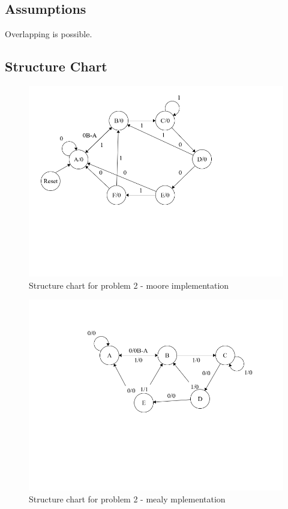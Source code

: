 \documentclass[11pt]{report}
\begin{document}
\subsection{Assumptions}
Overlapping is possible.
\pagebreak
\subsection{Structure Chart}
	\begin{figure}[h!]
	\centering
	\includegraphics[scale=0.7]{images/shots21}
	\caption{Structure chart for problem 2 - moore implementation}	
	\end{figure}
	\pagebreak
	\begin{figure}[h!]
	\centering
	\includegraphics[scale=0.7]{images/shots22}
	\caption{Structure chart for problem 2 - mealy mplementation}	
	\end{figure}
	\pagebreak
\end{document}
